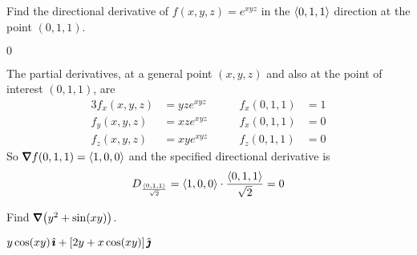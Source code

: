 


\subsection*{\Conceptual}



\begin{question}[M200 2008A] %
Find the directional derivative of $f(x,y,z) = e^{xyz}$ in the $\left< 0,1,1\right>$ 
direction at the point $(0,1,1)$.
\end{question}

%

\begin{answer}
$0$
\end{answer}

\begin{solution}
The partial derivatives, at a general point $(x,y,z)$ and
also at the point of interest $(0,1,1)$, are
\begin{alignat*}{3}
f_x(x,y,z)&=yz e^{xyz}\qquad &
   f_x(0,1,1)&= 1 \\
f_y(x,y,z)&=xz e^{xyz}\qquad &
   f_x(0,1,1)&= 0 \\
f_z(x,y,z)&=xy e^{xyz}\qquad &
   f_z(0,1,1)&= 0 
\end{alignat*}
So $\vnabla f(0,1,1) =\llt 1,0,0\rgt$ and the specified directional derivative
is
\begin{align*}
D_{\frac{\left< 0,1,1\right>}{\sqrt{2}}}
=\left< 1,0,0\right>\cdot\frac{\left< 0,1,1\right>}{\sqrt{2}}
=0
\end{align*}
\end{solution}

\begin{question}[M200 2008A] %
Find $\vnabla\big(y^2 + \sin(xy)\big)$.
\end{question}

%

\begin{answer}
$y\cos(xy)\,\hat{\pmb{\imath}} +  [2y + x\cos(xy)]\,\hat{\pmb{\jmath}}$
\end{answer}

